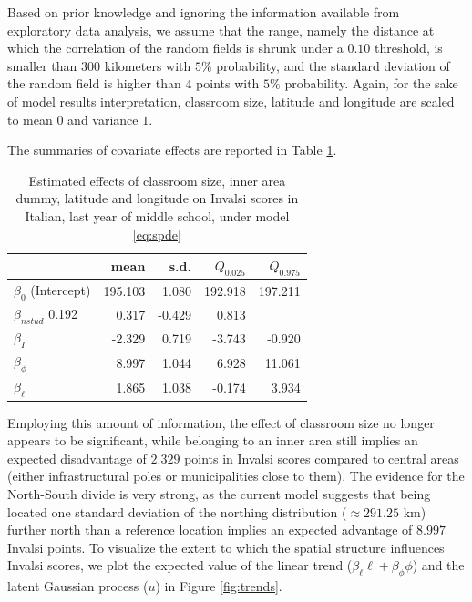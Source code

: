\documentclass{article}%
\begin{document}
Based on prior knowledge and ignoring the information available from exploratory data analysis, we assume that the range, namely the distance at which the correlation of the random fields is shrunk under a $0.10$ threshold, is smaller than $300$ kilometers with $5\%$ probability, and the standard deviation of the random field is higher than $4$ points with $5\%$ probability. Again, for the sake of model results interpretation, classroom size, latitude and longitude are scaled to mean $0$ and variance $1$. 

The summaries of covariate effects are reported in Table \ref{tab:betaSP}.
%
 \begin{table}
 \centering
\begin{tabular}{lrrrr}
 & mean & s.d. & $Q_{0.025}$ & $Q_{0.975}$ \\
 \hline
 $\beta_0$ (Intercept) & 195.103 & 1.080 & 192.918 & 197.211 \\  
 $\beta_{nstud}$ 0.192 & 0.317 & -0.429 & 0.813 \\ 
 $\beta_I$ & -2.329 & 0.719 & -3.743 & -0.920 \\ 
 $\beta_{\phi}$ & 8.997 & 1.044 & 6.928 & 11.061 \\ 
 $\beta_{\ell}$ &  1.865 & 1.038 & -0.174 & 3.934 \\ 
 \hline
\end{tabular}
\caption{Estimated effects of classroom size, inner area dummy, latitude and longitude on Invalsi scores in Italian, last year of middle school, under model \ref{eq:spde}}
\label{tab:betaSP}
\end{table}
%
Employing this amount of information, the effect of classroom size no longer appears to be significant, while belonging to an inner area still implies an expected disadvantage of $2.329 $ points in Invalsi scores compared to central areas (either infrastructural poles or municipalities close to them). The evidence for the North-South divide is very strong, as the current model suggests that being located one standard deviation of the northing distribution ($\approx 291.25$ km) further north than a reference location implies an expected advantage of $8.997$ Invalsi points. To visualize the extent to which the spatial structure influences Invalsi scores, we plot the expected value of the linear trend ($\beta_\ell \ell + \beta_\phi \phi$) and the latent Gaussian process ($u$) in Figure \ref{fig:trends}.
\end{document}
